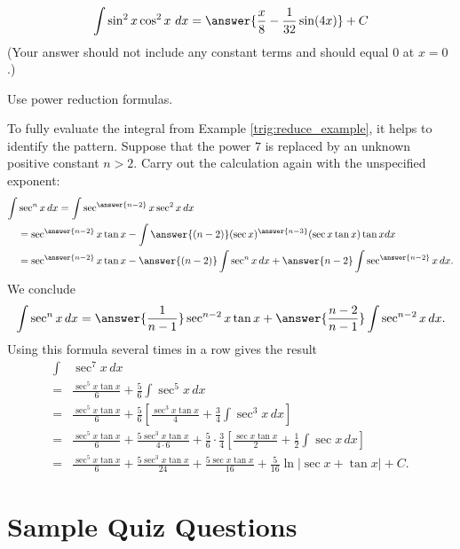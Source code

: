 \documentclass{ximera}
\begin{document}
\begin{exercise}%
\[ \int \sin^2 x\cos^2 x\ dx = \answer{\frac{x}{8}-\frac{1}{32} \sin (4 x)}+ C \]
(Your answer should not include any constant terms and should equal $0$ at $x = 0$.)
\begin{hint}
Use power reduction formulas.
\end{hint}
%
%
\end{exercise}

\begin{exercise}
To fully evaluate the integral from Example \ref{trig:reduce_example}, it helps to identify the pattern.  Suppose that the power $7$ is replaced by an unknown positive constant $n > 2$. Carry out the calculation again with the unspecified exponent:
\[ \begin{aligned}
\int & \sec^{n} x \, dx  = \int \sec^{\answer{n-2}} x  \sec^2 x \, dx \\
& = \sec^{\answer{n-2}} x \tan x - \int \answer{(n-2)} (\sec x)^{\answer{n-3}} (\sec x \tan x) \tan x dx \\
& = \sec^{\answer{n-2}} x \tan x - \answer{(n-2)}  \int \sec^{n} x \, dx + \answer{n-2} \int \sec^{\answer{n-2}} x \, dx.
\end{aligned} \]
We conclude
\[ \int \sec^n x \, dx = \answer{\frac{1}{n-1}} \sec^{n-2} x \tan x + \answer{\frac{n-2}{n-1}} \int \sec^{n-2} x \, dx. \]
Using this formula several times in a row gives the result
\[ \begin{aligned}
\int &  \sec^7 x \, dx \\
 = & \frac{\sec^5 x \tan x}{6} + \frac{5}{6} \int \sec^5 x \, dx \\
 = & \frac{\sec^5 x \tan x}{6} + \frac{5}{6}  \left[ \frac{\sec^3 x \tan x}{4} + \frac{3}{4} \int \sec^3 x \, dx \right] \\
 = & \frac{\sec^5 x \tan x}{6} +  \frac{5 \sec^3 x \tan x}{4 \cdot 6} + \frac{5}{6} \cdot \frac{3}{4} \left[ \frac{\sec x \tan x}{2} + \frac{1}{2} \int \sec x \, dx \right] \\
 = & \frac{\sec^5 x \tan x}{6} + \frac{5 \sec^3 x \tan x}{24} + \frac{5 \sec x \tan x}{16} + \frac{5}{16} \ln |\sec x + \tan x| + C.
\end{aligned} \]
\end{exercise}


\section*{Sample Quiz Questions}
\end{document}
